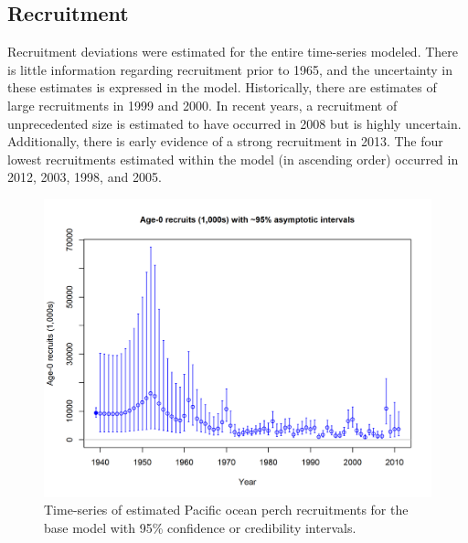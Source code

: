 \documentclass[12pt,]{article}
\begin{document}
\FloatBarrier

\subsection*{Recruitment}\label{recruitment}

Recruitment deviations were estimated for the entire time-series
modeled. There is little information regarding recruitment prior to
1965, and the uncertainty in these estimates is expressed in the model.
Historically, there are estimates of large recruitments in 1999 and
2000. In recent years, a recruitment of unprecedented size is estimated
to have occurred in 2008 but is highly uncertain. Additionally, there is
early evidence of a strong recruitment in 2013. The four lowest
recruitments estimated within the model (in ascending order) occurred in
2012, 2003, 1998, and 2005.

\begin{figure}
\centering
\includegraphics{r4ss/plots_mod1/ts11_Age-0_recruits_(1000s)_with_95_asymptotic_intervals.png}
\caption{Time-series of estimated Pacific ocean perch recruitments for
the base model with 95\% confidence or credibility intervals.
\label{fig:Recruits_all}}
\end{figure}
\end{document}
